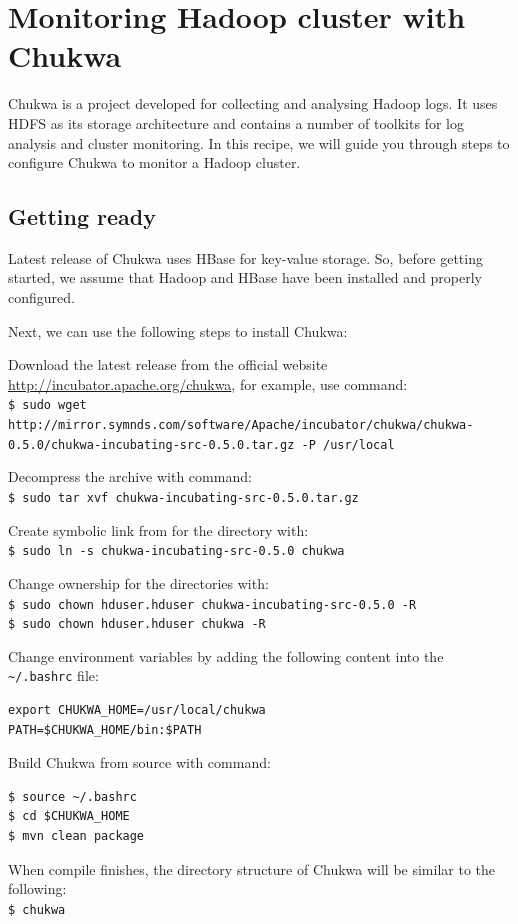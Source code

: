 \section{Monitoring Hadoop cluster with Chukwa}
Chukwa is a project developed for collecting and analysing Hadoop logs. It uses HDFS as its storage architecture and contains a number of toolkits for log analysis and cluster monitoring. In this recipe, we will guide you through steps to configure Chukwa to monitor a Hadoop cluster.
\subsection*{Getting ready}
Latest release of Chukwa uses HBase for key-value storage. So, before getting started, we assume that Hadoop and HBase have been installed and properly configured.

Next, we can use the following steps to install Chukwa:

Download the latest release from the official website \url{http://incubator.apache.org/chukwa}, for example, use command: \\
\verb|$ sudo wget http://mirror.symnds.com/software/Apache/incubator/chukwa/chukwa-0.5.0/chukwa-incubating-src-0.5.0.tar.gz -P /usr/local|

Decompress the archive with command: \\
\verb|$ sudo tar xvf chukwa-incubating-src-0.5.0.tar.gz|

Create symbolic link from for the directory with: \\
\verb|$ sudo ln -s chukwa-incubating-src-0.5.0 chukwa|

Change ownership for the directories with: \\
\verb|$ sudo chown hduser.hduser chukwa-incubating-src-0.5.0 -R| \\
\verb|$ sudo chown hduser.hduser chukwa -R|

Change environment variables by adding the following content into the \verb|~/.bashrc| file: 
\begin{verbatim}
export CHUKWA_HOME=/usr/local/chukwa
PATH=$CHUKWA_HOME/bin:$PATH
\end{verbatim}

Build Chukwa from source with command: 
\begin{verbatim}
$ source ~/.bashrc
$ cd $CHUKWA_HOME
$ mvn clean package
\end{verbatim}

When compile finishes, the directory structure of Chukwa will be similar to the following:\\
\verb|$ chukwa|

